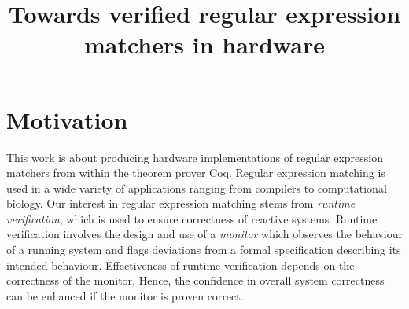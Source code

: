 \documentclass{article}
\date{}
\author{}
\title{Towards verified regular expression matchers in hardware}
\begin{document}
\maketitle

\section{Motivation}
This work is about producing hardware implementations of regular
expression matchers from within the theorem prover Coq.
Regular expression matching is used in a wide variety of
applications ranging from compilers to computational biology.
Our interest in regular expression matching stems from \emph{runtime
verification}, which is used to ensure correctness of reactive
systems.
Runtime verification involves the design and use of a \emph{monitor}
which observes the behaviour of a running system and flags deviations
from a formal specification describing its intended behaviour.
%
%
Effectiveness of runtime verification depends on the correctness of
the monitor.
Hence, the confidence in overall system correctness can be enhanced if
the monitor is proven correct.
%
\end{document}
